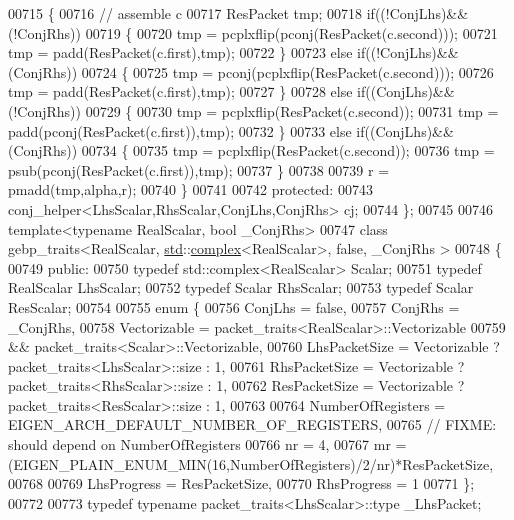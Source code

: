 \begin{DoxyCode}
00715 \textcolor{keyword}{  }\{
00716     \textcolor{comment}{// assemble c}
00717     ResPacket tmp;
00718     \textcolor{keywordflow}{if}((!ConjLhs)&&(!ConjRhs))
00719     \{
00720       tmp = pcplxflip(pconj(ResPacket(c.second)));
00721       tmp = padd(ResPacket(c.first),tmp);
00722     \}
00723     \textcolor{keywordflow}{else} \textcolor{keywordflow}{if}((!ConjLhs)&&(ConjRhs))
00724     \{
00725       tmp = pconj(pcplxflip(ResPacket(c.second)));
00726       tmp = padd(ResPacket(c.first),tmp);
00727     \}
00728     \textcolor{keywordflow}{else} \textcolor{keywordflow}{if}((ConjLhs)&&(!ConjRhs))
00729     \{
00730       tmp = pcplxflip(ResPacket(c.second));
00731       tmp = padd(pconj(ResPacket(c.first)),tmp);
00732     \}
00733     \textcolor{keywordflow}{else} \textcolor{keywordflow}{if}((ConjLhs)&&(ConjRhs))
00734     \{
00735       tmp = pcplxflip(ResPacket(c.second));
00736       tmp = psub(pconj(ResPacket(c.first)),tmp);
00737     \}
00738     
00739     r = pmadd(tmp,alpha,r);
00740   \}
00741 
00742 \textcolor{keyword}{protected}:
00743   conj\_helper<LhsScalar,RhsScalar,ConjLhs,ConjRhs> cj;
00744 \};
00745 
00746 \textcolor{keyword}{template}<\textcolor{keyword}{typename} RealScalar, \textcolor{keywordtype}{bool} \_ConjRhs>
00747 \textcolor{keyword}{class }gebp\_traits<RealScalar, \hyperlink{namespacestd}{std}::\hyperlink{structcomplex}{complex}<RealScalar>, false, \_ConjRhs >
00748 \{
00749 \textcolor{keyword}{public}:
00750   \textcolor{keyword}{typedef} std::complex<RealScalar>  Scalar;
00751   \textcolor{keyword}{typedef} RealScalar  LhsScalar;
00752   \textcolor{keyword}{typedef} Scalar      RhsScalar;
00753   \textcolor{keyword}{typedef} Scalar      ResScalar;
00754 
00755   \textcolor{keyword}{enum} \{
00756     ConjLhs = \textcolor{keyword}{false},
00757     ConjRhs = \_ConjRhs,
00758     Vectorizable = packet\_traits<RealScalar>::Vectorizable
00759                 && packet\_traits<Scalar>::Vectorizable,
00760     LhsPacketSize = Vectorizable ? packet\_traits<LhsScalar>::size : 1,
00761     RhsPacketSize = Vectorizable ? packet\_traits<RhsScalar>::size : 1,
00762     ResPacketSize = Vectorizable ? packet\_traits<ResScalar>::size : 1,
00763     
00764     NumberOfRegisters = EIGEN\_ARCH\_DEFAULT\_NUMBER\_OF\_REGISTERS,
00765     \textcolor{comment}{// FIXME: should depend on NumberOfRegisters}
00766     nr = 4,
00767     mr = (EIGEN\_PLAIN\_ENUM\_MIN(16,NumberOfRegisters)/2/nr)*ResPacketSize,
00768 
00769     LhsProgress = ResPacketSize,
00770     RhsProgress = 1
00771   \};
00772 
00773   \textcolor{keyword}{typedef} \textcolor{keyword}{typename} packet\_traits<LhsScalar>::type  \_LhsPacket;

\end{DoxyCode}
